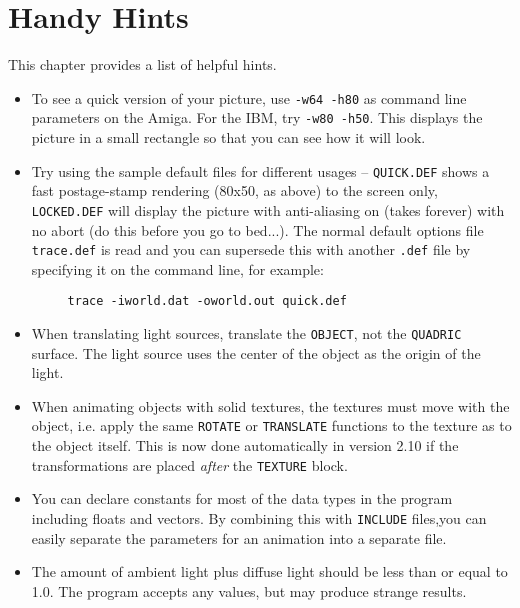 \chapter{Handy Hints}

This chapter provides a list of helpful hints.

\begin{itemize}
\item To see a quick version of your picture, use
{\tt -w64 -h80} as command
line parameters on the Amiga.  For the IBM, try {\tt -w80 -h50}.  This
displays the picture in a small rectangle so that you can see how
it will look.

\item Try using the sample default files for different usages --
{\tt QUICK.DEF}
shows a fast postage-stamp rendering (80x50, as above) to the
screen only, {\tt LOCKED.DEF} will display the picture with anti-aliasing
on (takes forever) with no abort (do this before you go to bed...).
The normal default options file
{\tt trace.def} is read
and you can supersede this with another {\tt .def} file by specifying
it on the command line, for example:
\begin{verbatim}
     trace -iworld.dat -oworld.out quick.def
\end{verbatim}

\item When translating light sources,
translate the {\tt OBJECT}, not the
{\tt QUADRIC} surface.  The light source uses the
center of the object as the origin of the light.

\item When animating objects with solid
textures, the textures must
move with the object, i.e. apply the same {\tt ROTATE} or
{\tt TRANSLATE} functions to the texture as to the object itself.  This is
now done automatically in version 2.10 if the transformations are
placed {\em after} the {\tt TEXTURE} block.

\item You can declare constants for most of the data types in the program
including floats and vectors.  By combining this with
{\tt INCLUDE} files,you can easily separate the
parameters for an animation into a separate file.

\item The amount of ambient light plus diffuse light should be less than
or equal to 1.0. The program accepts
any values, but may produce strange results.


\end{itemize}
